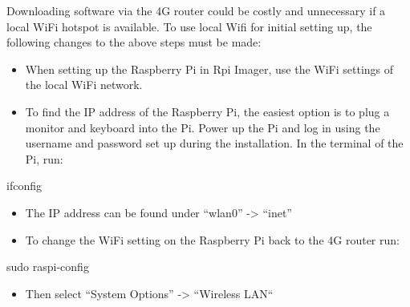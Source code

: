 \documentclass[
  letterpaper,
]{scrbook}
\newenvironment{Shaded}{\begin{snugshade}}{\end{snugshade}}
\newcommand{\ExtensionTok}[1]{\textcolor[rgb]{0.00,0.23,0.31}{#1}}
\newcommand{\FunctionTok}[1]{\textcolor[rgb]{0.28,0.35,0.67}{#1}}
\newcommand{\NormalTok}[1]{\textcolor[rgb]{0.00,0.23,0.31}{#1}}
\providecommand{\tightlist}{%
  \setlength{\itemsep}{0pt}\setlength{\parskip}{0pt}}
\begin{document}
\begin{tcolorbox}[enhanced jigsaw, left=2mm, toptitle=1mm, breakable, opacitybacktitle=0.6, title=\textcolor{quarto-callout-note-color}{\faInfo}\hspace{0.5em}{Note}, colback=white, opacityback=0, rightrule=.15mm, leftrule=.75mm, colbacktitle=quarto-callout-note-color!10!white, bottomtitle=1mm, titlerule=0mm, coltitle=black, colframe=quarto-callout-note-color-frame, arc=.35mm, bottomrule=.15mm, toprule=.15mm]

Downloading software via the 4G router could be costly and unnecessary
if a local WiFi hotspot is available. To use local Wifi for initial
setting up, the following changes to the above steps must be made:

\begin{itemize}
\item
  When setting up the Raspberry Pi in Rpi Imager, use the WiFi settings
  of the local WiFi network.
\item
  To find the IP address of the Raspberry Pi, the easiest option is to
  plug a monitor and keyboard into the Pi. Power up the Pi and log in
  using the username and password set up during the installation. In the
  terminal of the Pi, run:
\end{itemize}

\begin{Shaded}
\begin{Highlighting}[]
\ExtensionTok{ifconfig} 
\end{Highlighting}
\end{Shaded}

\begin{itemize}
\item
  The IP address can be found under ``wlan0'' -\textgreater{} ``inet''
\item
  To change the WiFi setting on the Raspberry Pi back to the 4G router
  run:
\end{itemize}

\begin{Shaded}
\begin{Highlighting}[]
\FunctionTok{sudo}\NormalTok{ raspi{-}config}
\end{Highlighting}
\end{Shaded}

\begin{itemize}
\tightlist
\item
  Then select ``System Options'' -\textgreater{} ``Wireless LAN``
\end{itemize}

\end{tcolorbox}
\end{document}
